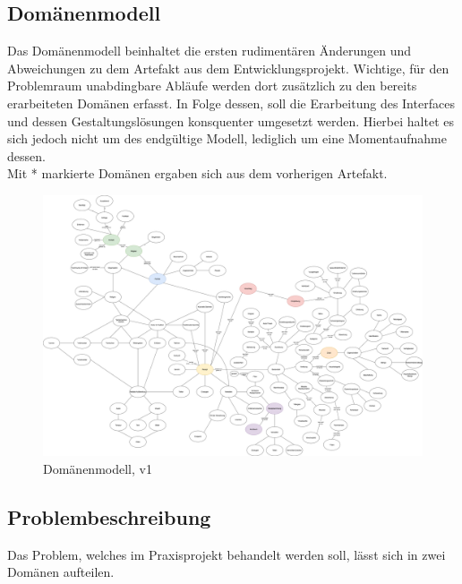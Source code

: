 \documentclass[10pt]{article}
\begin{document}
        \subsection{Domänenmodell}\label{sec:Domaenenmodell}
        Das Domänenmodell beinhaltet die ersten rudimentären Änderungen und Abweichungen zu dem Artefakt aus dem Entwicklungsprojekt. Wichtige, für den Problemraum unabdingbare Abläufe werden dort zusätzlich zu den bereits erarbeiteten Domänen erfasst. In Folge dessen, soll die Erarbeitung des Interfaces und dessen Gestaltungslösungen konsquenter umgesetzt werden. Hierbei haltet es sich jedoch nicht um des endgültige Modell, lediglich um eine Momentaufnahme dessen. \\
        Mit * markierte Domänen ergaben sich aus dem vorherigen Artefakt.\cite{cobanmai2021}
        \begin{figure}[h] %
            \includegraphics[width=1\textwidth]{../../Domänenmodell/PPSS21_Mai_Domänenmodell.png}
            \caption[Das Domänenmodell]{Domänenmodell, v1}
            \label{fig:domaenenmodell}
        \end{figure}

        \subsection{Problembeschreibung}\label{sec:Problembeschreibung}
        Das Problem, welches im Praxisprojekt behandelt werden soll, lässt sich in zwei Domänen aufteilen.
\end{document}
